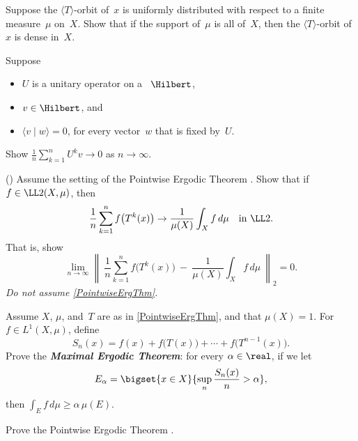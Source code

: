 \begin{exercises}

\item Suppose the $\langle T \rangle$-orbit of~$x$ is uniformly distributed with respect to a finite measure~$\mu$ on~$X$. Show that if the support of~$\mu$ is all of~$X$, then the $\langle T \rangle$-orbit of~$x$ is dense in~$X$.

\item \label{IterateUnitaryEx}
Suppose 
	\begin{itemize}
	\item $U$ is a unitary operator on a ~$\Hilbert$, 
	\item $v \in \Hilbert$,
	and
	\item $\langle v \mid w \rangle = 0$, for every vector~$w$ that is fixed by~$U$.
	\end{itemize}
Show $\frac{1}{n} \sum_{k=1}^n U^k v \to 0$ as $n \to \infty$.

\item \label{MeanErgThmEx}
()
Assume the setting of the Pointwise Ergodic Theorem .
Show that if $f \in \LL2(X,\mu)$, then
	$$\frac{1}{n} \sum_{k=1}^n f \bigl( T^k(x) \bigr) \to \frac{1}{\mu(X)} \int_X f \, d\mu \text{\quad in $\LL2$} .$$
That is, show
	$$ \lim_{n \to \infty} \left\| \ \frac{1}{n} \sum_{k=1}^n f \bigl( T^k(x) \bigr) 
	\  - \  \frac{1}{\mu(X)} \int_X f \, d\mu \ \right\|_2 = 0 .$$
\emph{Do not assume \cref{PointwiseErgThm}.}

\item \label{PtwiseErgZMaxl}
 Assume $X$, $\mu$, and~$T$ are as in \cref{PointwiseErgThm}, and that $\mu(X) = 1$. For $f \in L^1(X,\mu)$, define
	$$ S_n(x) =  f(x) + f \bigl( T(x) \bigr) + \cdots + f \bigl( T^{n-1}(x) \bigr) .$$
  Prove the \textit{\textbf{Maximal Ergodic
Theorem}}: for every $\alpha \in \real$, if we let
 $$ E_\alpha = \bigset{ x \in X }{ \sup_n \frac{S_n(x)}{n} > \alpha} ,$$
 then $\int_E f \, d\mu \ge \alpha \, \mu(E)$.

\item \label{PtwiseErgZ}
 Prove the Pointwise Ergodic Theorem .


\end{exercises}

